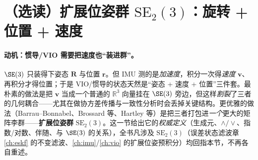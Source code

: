 \section{（选读）扩展位姿群 \texorpdfstring{$\mathrm{SE}_2(3)$}{SE2(3)}：旋转 + 位置 + 速度}
\label{sec:se23}

\paragraph{动机：惯导/VIO 需要把速度也“装进群”。}
$\SE(3)$ 只装得下姿态 $\mathbf{R}$ 与位置 $\mathbf{r}$。但 IMU 测的是\emph{加速度}，积分一次得\emph{速度} $\mathbf{v}$、再积分才得位置；于是 VIO/惯导的状态天然是“姿态 + 速度 + 位置”三件套。最朴素的做法是把 $\mathbf{v}$ 当成一个普通的 $\mathbb{R}^3$ 向量挂在 $\SE(3)$ 旁边，但这样\emph{割裂}了三者的几何耦合——尤其在做协方差传播与一致性分析时会丢掉关键结构。更优雅的做法（Barrau--Bonnabel\cite{barrau2017invariant}、Brossard 等\cite{brossard2021associating}、Hartley 等\cite{hartley2020contact}）是把三者打包进\emph{一个}更大的矩阵李群——\textbf{扩展位姿群} $\mathrm{SE}_2(3)$。这一节给出它的\emph{权威定义}（生成元、$\wedge/\vee$、指数/对数、伴随、与 $\SE(3)$ 的关系），全书凡涉及 $\mathrm{SE}_2(3)$（误差状态滤波章 \cref{ch:eskf} 的不变滤波、\cref{ch:imu}/\cref{ch:vio} 的扩展位姿预积分）均回指本节，不再各自重述。

